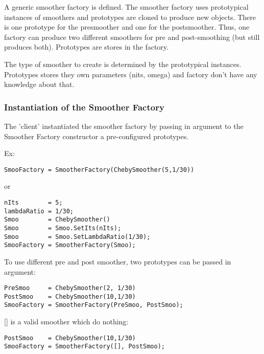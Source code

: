 
A generic smoother factory is defined. The smoother factory uses
prototypical instances of smoothers and prototypes are cloned to
produce new objects. There is one prototype for the presmoother and
one for the postsmoother. Thus, one factory can produce two different
smoothers for pre and post-smoothing (but still produces both).
Prototypes are stores in the factory.

The type of smoother to create is determined by the prototypical instances.
Prototypes stores they own parameters (nits, omega) and factory don't have any knowledge about that.

\subsubsection{Instantiation of the Smoother Factory}
The 'client' instantiated the smoother factory by passing in argument to the Smoother Factory constructor a pre-configured prototypes.

Ex:

\begin{verbatim}
SmooFactory = SmootherFactory(ChebySmoother(5,1/30))
\end{verbatim}

or 

\begin{verbatim}
nIts        = 5;
lambdaRatio = 1/30;
Smoo        = ChebySmoother()
Smoo        = Smoo.SetIts(nIts);
Smoo        = Smoo.SetLambdaRatio(1/30); 
SmooFactory = SmootherFactory(Smoo);
\end{verbatim}

To use different pre and post smoother, two prototypes can be passed in argument:
\begin{verbatim}
PreSmoo     = ChebySmoother(2, 1/30)
PostSmoo    = ChebySmoother(10,1/30)
SmooFactory = SmootherFactory(PreSmoo, PostSmoo);
\end{verbatim}

[] is a valid smoother which do nothing:
\begin{verbatim}
PostSmoo    = ChebySmoother(10,1/30)
SmooFactory = SmootherFactory([], PostSmoo);
\end{verbatim}


